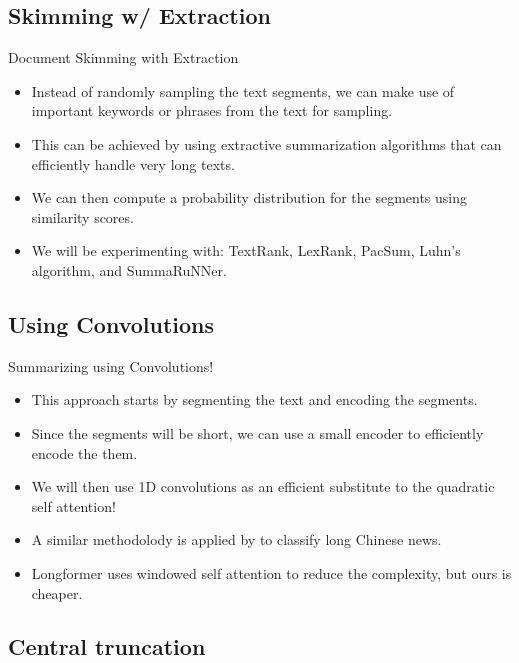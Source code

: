 \subsection{Skimming w/ Extraction}

\begin{frame}{Document Skimming with Extraction}

\begin{itemize}
	\item Instead of randomly sampling the text segments, we can make use of important
	keywords or phrases from the text for sampling.
	\item<2-> This can be achieved by using extractive summarization algorithms that can
	efficiently handle very long texts.
	\item<3-> We can then compute a probability distribution for the segments using
	similarity scores.
	\item<4> We will be experimenting with: TextRank, LexRank, PacSum, Luhn's algorithm,
	and SummaRuNNer.
\end{itemize}

\end{frame}


\subsection{Using Convolutions}

\begin{frame}{Summarizing using Convolutions!}

\begin{itemize}
	\item This approach starts by segmenting the text and encoding the segments.
	\item<2-> Since the segments will be short, we can use a small encoder to efficiently
	encode the them.
	\item<3-> We will then use 1D convolutions as an efficient substitute to the
	quadratic self attention!
	\item<4-> A similar methodolody is applied by \citet{chen2022long} to classify long
	Chinese news.
	\item<5> Longformer \citep{beltagy2020longformer} uses windowed self attention to
	reduce the complexity, but ours is cheaper.
\end{itemize}
	
\end{frame}


\subsection{Central truncation}

